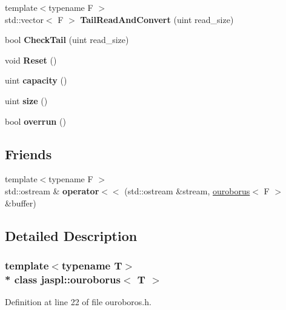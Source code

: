 \begin{DoxyCompactItemize}
\item 
{\footnotesize template$<$typename F $>$ }\\std\+::vector$<$ F $>$ {\bfseries Tail\+Read\+And\+Convert} (uint read\+\_\+size)\hypertarget{classjaspl_1_1ouroborus_aec03e5659e53b7f47b011ae8f4ed005d}{}\label{classjaspl_1_1ouroborus_aec03e5659e53b7f47b011ae8f4ed005d}

\item 
bool {\bfseries Check\+Tail} (uint read\+\_\+size)\hypertarget{classjaspl_1_1ouroborus_ac22cf95482e411c2197aed495c97d8e6}{}\label{classjaspl_1_1ouroborus_ac22cf95482e411c2197aed495c97d8e6}

\item 
void {\bfseries Reset} ()\hypertarget{classjaspl_1_1ouroborus_a5310f41f32ed0961a4658752066e8cca}{}\label{classjaspl_1_1ouroborus_a5310f41f32ed0961a4658752066e8cca}

\item 
uint {\bfseries capacity} ()\hypertarget{classjaspl_1_1ouroborus_a212abb4f554e9bb68d6570a9215b6896}{}\label{classjaspl_1_1ouroborus_a212abb4f554e9bb68d6570a9215b6896}

\item 
uint {\bfseries size} ()\hypertarget{classjaspl_1_1ouroborus_a417ccee8ba98c637c569c45f466bfa21}{}\label{classjaspl_1_1ouroborus_a417ccee8ba98c637c569c45f466bfa21}

\item 
bool {\bfseries overrun} ()\hypertarget{classjaspl_1_1ouroborus_a83fca643268f7cc436833e82b557bcea}{}\label{classjaspl_1_1ouroborus_a83fca643268f7cc436833e82b557bcea}

\end{DoxyCompactItemize}
\subsection*{Friends}
\begin{DoxyCompactItemize}
\item 
{\footnotesize template$<$typename F $>$ }\\std\+::ostream \& {\bfseries operator$<$$<$} (std\+::ostream \&stream, \hyperlink{classjaspl_1_1ouroborus}{ouroborus}$<$ F $>$ \&buffer)\hypertarget{classjaspl_1_1ouroborus_a0c1f627811212d72eb869d0bf3db05ec}{}\label{classjaspl_1_1ouroborus_a0c1f627811212d72eb869d0bf3db05ec}

\end{DoxyCompactItemize}


\subsection{Detailed Description}
\subsubsection*{template$<$typename T$>$\\*
class jaspl\+::ouroborus$<$ T $>$}



Definition at line 22 of file ouroboros.\+h.

